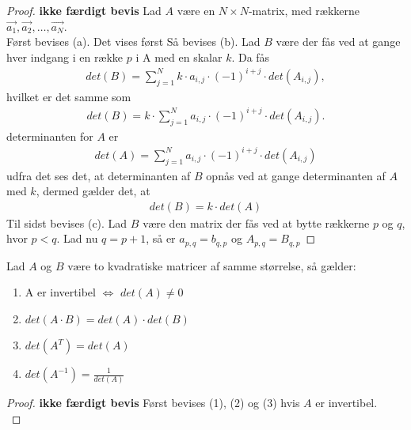 \begin{proof}
\textbf{ikke færdigt bevis}
Lad $A$ være en $N \times N$-matrix, med rækkerne $\vec{a_1}, \vec{a_2}, \dots , \vec{a_N}$. \\
Først bevises (a). 
Det vises først
Så bevises (b). 
Lad $B$ være der fås ved at gange hver indgang i en række $p$ i A med en skalar $k$. 
Da fås 
\begin{align*}
det(B)=\sum_{j=1}^{N}k \cdot a_{i,j} \cdot (-1)^{i+j} \cdot det(A_{i,j}),
\end{align*}
hvilket er det samme som 
\begin{align*}
det(B)=k \cdot \sum_{j=1}^{N}a_{i,j} \cdot (-1)^{i+j} \cdot det(A_{i,j}).
\end{align*}
determinanten for $A$ er
\begin{align*}
det(A)=\sum_{j=1}^{N}a_{i,j} \cdot (-1)^{i+j} \cdot det(A_{i,j})
\end{align*}
udfra det ses det, at determinanten af $B$ opnås ved at gange determinanten af $A$ med $k$, dermed gælder det, at
\begin{align*}
det(B)=k \cdot det(A)
\end{align*}
Til sidst bevises (c). 
Lad $B$ være den matrix der fås ved at bytte rækkerne $p$ og $q$, hvor $p<q$. 
Lad nu $q=p+1$, så er $a_{p,q}=b_{q,p}$ og $A_{p,q}=B_{q,p}$
\end{proof}

\begin{stn}
Lad $A$ og $B$ være to kvadratiske matricer af samme størrelse, så gælder:
\begin{enumerate}
\item A er invertibel $\Leftrightarrow$ $det(A) \neq 0$
\item $det(A \cdot B) = det(A) \cdot det(B)$
\item $det(A^T)=det(A)$
\item $det(A^{-1})=\frac{1}{det(A)}$
\end{enumerate}
\end{stn}

\begin{proof}
\textbf{ikke færdigt bevis}
Først bevises (1), (2) og (3) hvis $A$ er invertibel.\\
\end{proof}